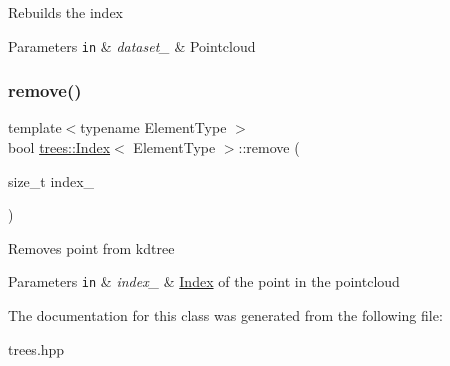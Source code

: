 Rebuilds the index


\begin{DoxyParams}[1]{Parameters}
\mbox{\tt in}  & {\em dataset\+\_\+} & Pointcloud \\
\hline
\end{DoxyParams}
\mbox{\label{classtrees_1_1_index_ad506d4fd5a9c35a1e86d2241b7f8c370}} 
\subsubsection{\texorpdfstring{remove()}{remove()}}
{\footnotesize\ttfamily template$<$typename Element\+Type $>$ \\
bool \hyperlink{classtrees_1_1_index}{trees\+::\+Index}$<$ Element\+Type $>$\+::remove (\begin{DoxyParamCaption}\item[{size\+\_\+t}]{index\+\_\+ }\end{DoxyParamCaption})\hspace{0.3cm}{\ttfamily [inline]}}

Removes point from kdtree


\begin{DoxyParams}[1]{Parameters}
\mbox{\tt in}  & {\em index\+\_\+} & \hyperlink{classtrees_1_1_index}{Index} of the point in the pointcloud \\
\hline
\end{DoxyParams}


The documentation for this class was generated from the following file\+:\begin{DoxyCompactItemize}
\item 
trees.\+hpp\end{DoxyCompactItemize}
